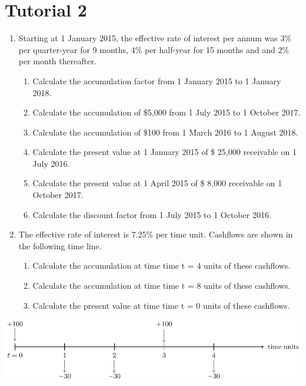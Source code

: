 \documentclass[
]{book}
\theoremstyle{definition}
\theoremstyle{definition}
\theoremstyle{definition}
\theoremstyle{definition}
\theoremstyle{remark}
\begin{document}
\section{Tutorial 2}\label{tutorial-2}

\begin{enumerate}
\def\labelenumi{\arabic{enumi}.}
\item
  Starting at 1 January 2015, the effective rate of interest per annum
  was 3\% per quarter-year for 9 months, 4\% per half-year for 15 months
  and and 2\% per month thereafter.

  \begin{enumerate}
  \def\labelenumii{\arabic{enumii}.}
  \item
    Calculate the accumulation factor from 1 January 2015 to 1
    January 2018.
  \item
    Calculate the accumulation of \$5,000 from 1 July 2015 to 1
    October 2017.
  \item
    Calculate the accumulation of \$100 from 1 March 2016 to 1
    August 2018.
  \item
    Calculate the present value at 1 January 2015 of \$ 25,000
    receivable on 1 July 2016.
  \item
    Calculate the present value at 1 April 2015 of \$ 8,000
    receivable on 1 October 2017.
  \item
    Calculate the discount factor from 1 July 2015 to 1
    October 2016.
  \end{enumerate}
\item
  The effective rate of interest is 7.25\% per time unit. Cashflows are
  shown in the following time line.

  \begin{enumerate}
  \def\labelenumii{\arabic{enumii}.}
  \item
    Calculate the accumulation at time time t = 4 units of these
    cashflows.
  \item
    Calculate the accumulation at time time t = 8 units of these
    cashflows.
  \item
    Calculate the present value at time time t = 0 units of these
    cashflows.
  \end{enumerate}
\end{enumerate}

\begin{center}\includegraphics{SCMA266Bookdownproj_files/figure-latex/tikz-exam1-1} \end{center}
\end{document}
